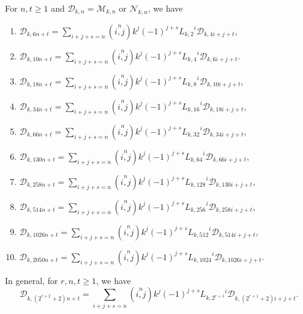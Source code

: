\begin{theorem}For $n, t\geq 1$ and $\mathcal{D}_{k,n}=\mathcal{M}_{k,n}$ or $\mathcal{N}_{k,n}$, we have\label{3.7}
\begin{enumerate}
\item $\mathcal{D}_{k,6n+t}=\sum\limits_{i+j+s=n}\left( \stackrel{n}{i,j}\right) k^{j}(-1)^{j+s}{L_{k,2}}^i\mathcal{D}_{k,4i+j+t} $,
\item $\mathcal{D}_{k,10n+t}=\sum\limits_{i+j+s=n}\left( \stackrel{n}{i,j}\right) k^{j}(-1)^{j+s}{L_{k,4}}^i\mathcal{D}_{k,6i+j+t} $.
\item $\mathcal{D}_{k,18n+t}=\sum\limits_{i+j+s=n}\left( \stackrel{n}{i,j}\right) k^{j}(-1)^{j+s}{L_{k,8}}^i\mathcal{D}_{k,10i+j+t} $,
\item $\mathcal{D}_{k,34n+t}=\sum\limits_{i+j+s=n}\left( \stackrel{n}{i,j}\right) k^{j}(-1)^{j+s}{L_{k,16}}^i\mathcal{D}_{k,18i+j+t} $,
\item $\mathcal{D}_{k,66n+t}=\sum\limits_{i+j+s=n}\left( \stackrel{n}{i,j}\right) k^{j}(-1)^{j+s}{L_{k,32}}^i\mathcal{D}_{k,34i+j+t} $,
\item $\mathcal{D}_{k,130n+t}=\sum\limits_{i+j+s=n}\left( \stackrel{n}{i,j}\right) k^{j}(-1)^{j+s}{L_{k,64}}^i\mathcal{D}_{k,66i+j+t} $,
\item $\mathcal{D}_{k,258n+t}=\sum\limits_{i+j+s=n}\left( \stackrel{n}{i,j}\right) k^{j}(-1)^{j+s}{L_{k,128}}^i\mathcal{D}_{k,130i+j+t} $,
\item $\mathcal{D}_{k,514n+t}=\sum\limits_{i+j+s=n}\left( \stackrel{n}{i,j}\right) k^{j}(-1)^{j+s}{L_{k,256}}^i\mathcal{D}_{k,258i+j+t} $,
\item $\mathcal{D}_{k,1026n+t}=\sum\limits_{i+j+s=n}\left( \stackrel{n}{i,j}\right) k^{j}(-1)^{j+s}{L_{k,512}}^i\mathcal{D}_{k,514i+j+t} $,
\item $\mathcal{D}_{k,2050n+t}=\sum\limits_{i+j+s=n}\left( \stackrel{n}{i,j}\right) k^{j}(-1)^{j+s}{L_{k,1024}}^i\mathcal{D}_{k,1026i+j+t} $.
\end{enumerate}
In general, for $r, n, t\geq 1$, we have
$$\mathcal{D}_{k,(2^{r+2}+2)n+t}=\sum\limits_{i+j+s=n}\left( \stackrel{n}{i,j}\right) k^{j}(-1)^{j+s}{L_{k,2^{r+1}}}^i\mathcal{D}_{k,(2^{r+1}+2)i+j+t}.$$
\end{theorem}
